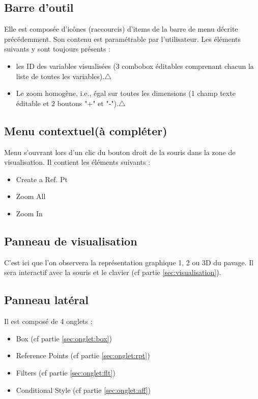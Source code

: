\documentclass[a4paper]{article}
\begin{document}
\subsection{Barre d'outil} 
Elle est composée d'icônes (raccourcis) d'items de la barre de menu décrite précédemment. Son contenu est paramétrable par l'utilisateur. Les éléments suivants y sont toujours présents :
\begin{itemize}
\item les ID des variables visualisées (3 combobox éditables comprenant chacun la liste de toutes les variables).$\triangle$
\item Le zoom homogène, i.e., égal sur toutes les dimensions (1 champ texte éditable et 2 boutons "+" et "-").$\triangle$
\end{itemize}

\subsection{Menu contextuel(à compléter)}
Menu s'ouvrant lors d'un clic du bouton droit de la souris dans la zone de visualisation. Il contient les éléments suivants :
\begin{itemize}
\item Create a Ref. Pt
\item Zoom All
\item Zoom In
\end{itemize}

\subsection{Panneau de visualisation}
C'est ici que l'on observera la représentation graphique 1, 2 ou 3D du pavage. Il sera interactif avec la souris et le clavier (cf partie \ref{sec:visualisation}).

\subsection{Panneau latéral}
Il est composé de 4 onglets :
\begin{itemize}
\item Box (cf partie \ref{sec:onglet:box})
\item Reference Points (cf partie \ref{sec:onglet:rpt})
\item Filters (cf partie \ref{sec:onglet:flt})
\item Conditional Style (cf partie \ref{sec:onglet:aff})
\end{itemize}
\end{document}
